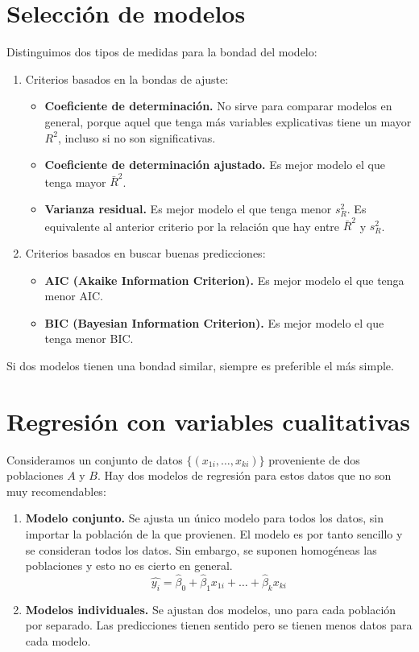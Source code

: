 \section{Selección de modelos}
Distinguimos dos tipos de medidas para la bondad del modelo:
\begin{enumerate}
    \item Criterios basados en la bondas de ajuste:
          \begin{itemize}
              \item \textbf{Coeficiente de determinación.}
                    No sirve para comparar modelos en general, porque aquel que tenga más variables explicativas tiene un mayor $R^2$, incluso si no son significativas.
              \item \textbf{Coeficiente de determinación ajustado.}
                    Es mejor modelo el que tenga mayor $\bar{R}^2$.
              \item \textbf{Varianza residual.}
                    Es mejor modelo el que tenga menor $s_R^2$.
                    Es equivalente al anterior criterio por la relación que hay entre $\bar{R}^2$ y $s_R^2$.
          \end{itemize}
    \item Criterios basados en buscar buenas predicciones:
          \begin{itemize}
              \item \textbf{AIC (Akaike Information Criterion).}
                    Es mejor modelo el que tenga menor AIC.
              \item \textbf{BIC (Bayesian Information Criterion).}
                    Es mejor modelo el que tenga menor BIC.
          \end{itemize}
\end{enumerate}

Si dos modelos tienen una bondad similar, siempre es preferible el más simple.

\section{Regresión con variables cualitativas}
Consideramos un conjunto de datos $\{(x_{1i}, \dots, x_{ki})\}$ proveniente de dos poblaciones $A$ y $B$.
Hay dos modelos de regresión para estos datos que no son muy recomendables:
\begin{enumerate}
    \item \textbf{Modelo conjunto.}
          Se ajusta un único modelo para todos los datos, sin importar la población de la que provienen.
          El modelo es por tanto sencillo y se consideran todos los datos.
          Sin embargo, se suponen homogéneas las poblaciones y esto no es cierto en general.
          $$\hat{y_i} = \hat{\beta}_0 + \hat{\beta}_1x_{1i} + \dots + \hat{\beta}_kx_{ki}$$
    \item \textbf{Modelos individuales.}
          Se ajustan dos modelos, uno para cada población por separado.
          Las predicciones tienen sentido pero se tienen menos datos para cada modelo.
\end{enumerate}

